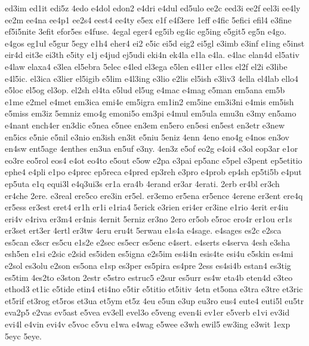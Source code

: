 {ed3im 
ed1it 
edi5z 
4edo 
e4dol 
edon2 
e4dri 
e4dul 
ed5ulo 
ee2c 
eed3i 
ee2f 
eel3i 
ee4ly 
ee2m 
ee4na 
ee4p1 
ee2s4 
eest4 
ee4ty 
e5ex 
e1f 
e4f3ere 
1eff 
e4fic 
5efici 
efil4 
e3fine 
ef5i5nite 
3efit 
efor5es 
e4fuse. 
4egal 
eger4 
eg5ib 
eg4ic 
eg5ing 
e5git5 
eg5n 
e4go. 
e4gos 
eg1ul 
e5gur 
5egy 
e1h4 
eher4 
ei2 
e5ic 
ei5d 
eig2 
ei5gl 
e3imb 
e3inf 
e1ing 
e5inst 
eir4d 
eit3e 
ei3th 
e5ity 
e1j 
e4jud 
ej5udi 
eki4n 
ek4la 
e1la 
e4la. 
e4lac 
elan4d 
el5ativ 
e4law 
elaxa4 
e3lea 
el5ebra 
5elec 
e4led 
el3ega 
e5len 
e4l1er 
e1les 
el2f 
el2i 
e3libe 
e4l5ic. 
el3ica 
e3lier 
el5igib 
e5lim 
e4l3ing 
e3lio 
e2lis 
el5ish 
e3liv3 
4ella 
el4lab 
ello4 
e5loc 
el5og 
el3op. 
el2sh 
el4ta 
e5lud 
el5ug 
e4mac 
e4mag 
e5man 
em5ana 
em5b 
e1me 
e2mel 
e4met 
em3ica 
emi4e 
em5igra 
em1in2 
em5ine 
em3i3ni 
e4mis 
em5ish 
e5miss 
em3iz 
5emniz 
emo4g 
emoni5o 
em3pi 
e4mul 
em5ula 
emu3n 
e3my 
en5amo 
e4nant 
ench4er 
en3dic 
e5nea 
e5nee 
en3em 
en5ero 
en5esi 
en5est 
en3etr 
e3new 
en5ics 
e5nie 
e5nil 
e3nio 
en3ish 
en3it 
e5niu 
5eniz 
4enn 
4eno 
eno4g 
e4nos 
en3ov 
en4sw 
ent5age 
4enthes 
en3ua 
en5uf 
e3ny. 
4en3z 
e5of 
eo2g 
e4oi4 
e3ol 
eop3ar 
e1or 
eo3re 
eo5rol 
eos4 
e4ot 
eo4to 
e5out 
e5ow 
e2pa 
e3pai 
ep5anc 
e5pel 
e3pent 
ep5etitio 
ephe4 
e4pli 
e1po 
e4prec 
ep5reca 
e4pred 
ep3reh 
e3pro 
e4prob 
ep4sh 
ep5ti5b 
e4put 
ep5uta 
e1q 
equi3l 
e4q3ui3s 
er1a 
era4b 
4erand 
er3ar 
4erati. 
2erb 
er4bl 
er3ch 
er4che 
2ere. 
e3real 
ere5co 
ere3in 
er5el. 
er3emo 
er5ena 
er5ence 
4erene 
er3ent 
ere4q 
er5ess 
er3est 
eret4 
er1h 
er1i 
e1ria4 
5erick 
e3rien 
eri4er 
er3ine 
e1rio 
4erit 
er4iu 
eri4v 
e4riva 
er3m4 
er4nis 
4ernit 
5erniz 
er3no 
2ero 
er5ob 
e5roc 
ero4r 
er1ou 
er1s 
er3set 
ert3er 
4ertl 
er3tw 
4eru 
eru4t 
5erwau 
e1s4a 
e4sage. 
e4sages 
es2c 
e2sca 
es5can 
e3scr 
es5cu 
e1s2e 
e2sec 
es5ecr 
es5enc 
e4sert. 
e4serts 
e4serva 
4esh 
e3sha 
esh5en 
e1si 
e2sic 
e2sid 
es5iden 
es5igna 
e2s5im 
es4i4n 
esis4te 
esi4u 
e5skin 
es4mi 
e2sol 
es3olu 
e2son 
es5ona 
e1sp 
es3per 
es5pira 
es4pre 
2ess 
es4si4b 
estan4 
es3tig 
es5tim 
4es2to 
e3ston 
2estr 
e5stro 
estruc5 
e2sur 
es5urr 
es4w 
eta4b 
eten4d 
e3teo 
ethod3 
et1ic 
e5tide 
etin4 
eti4no 
e5tir 
e5titio 
et5itiv 
4etn 
et5ona 
e3tra 
e3tre 
et3ric 
et5rif 
et3rog 
et5ros 
et3ua 
et5ym 
et5z 
4eu 
e5un 
e3up 
eu3ro 
eus4 
eute4 
euti5l 
eu5tr 
eva2p5 
e2vas 
ev5ast 
e5vea 
ev3ell 
evel3o 
e5veng 
even4i 
ev1er 
e5verb 
e1vi 
ev3id 
evi4l 
e4vin 
evi4v 
e5voc 
e5vu 
e1wa 
e4wag 
e5wee 
e3wh 
ewil5 
ew3ing 
e3wit 
1exp 
5eyc 
5eye. 
}
